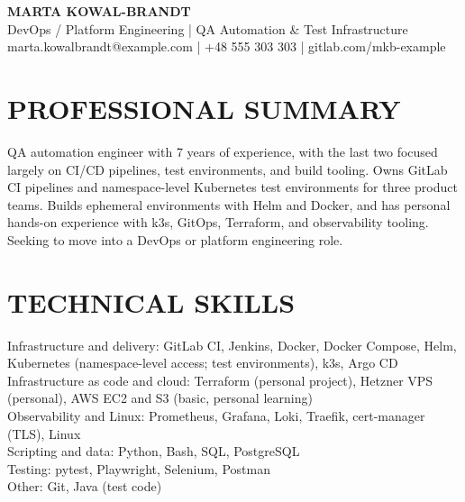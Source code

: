 \documentclass[11pt,a4paper]{article}
\begin{document}
\begin{center}
{\LARGE\bfseries\color{primarycolor} MARTA KOWAL-BRANDT}\\[0.25em]
{\large DevOps / Platform Engineering | QA Automation \& Test Infrastructure}\\[0.2em]
marta.kowalbrandt@example.com | +48 555 303 303 | gitlab.com/mkb-example
\end{center}
\vspace{-0.4em}
\section*{PROFESSIONAL SUMMARY}
QA automation engineer with 7 years of experience, with the last two focused largely on CI/CD pipelines, test environments, and build tooling. Owns GitLab CI pipelines and namespace-level Kubernetes test environments for three product teams. Builds ephemeral environments with Helm and Docker, and has personal hands-on experience with k3s, GitOps, Terraform, and observability tooling. Seeking to move into a DevOps or platform engineering role.

\section*{TECHNICAL SKILLS}
Infrastructure and delivery: GitLab CI, Jenkins, Docker, Docker Compose, Helm, Kubernetes (namespace-level access; test environments), k3s, Argo CD\\
Infrastructure as code and cloud: Terraform (personal project), Hetzner VPS (personal), AWS EC2 and S3 (basic, personal learning)\\
Observability and Linux: Prometheus, Grafana, Loki, Traefik, cert-manager (TLS), Linux\\
Scripting and data: Python, Bash, SQL, PostgreSQL\\
Testing: pytest, Playwright, Selenium, Postman\\
Other: Git, Java (test code)
\end{document}
